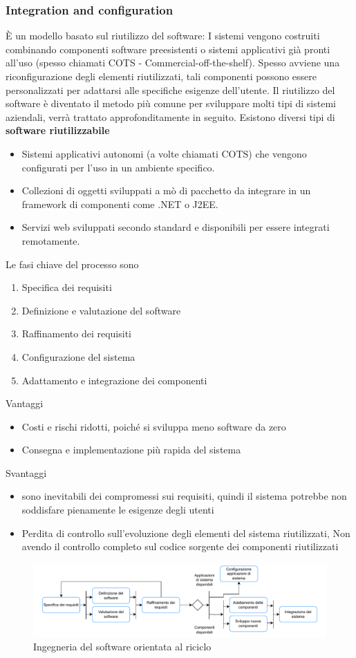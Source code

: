 \documentclass[10pt, letterpaper]{report}
\begin{document}
\subsubsection{Integration and configuration}
È un modello basato sul riutilizzo del software: I sistemi vengono costruiti combinando componenti software preesistenti o sistemi applicativi già pronti all'uso (spesso chiamati COTS - Commercial-off-the-shelf). Spesso avviene una riconfigurazione degli elementi riutilizzati, tali componenti possono essere personalizzati per adattarsi alle specifiche esigenze dell'utente. \acc Il riutilizzo del software è diventato il metodo più comune per sviluppare molti tipi di sistemi aziendali, verrà trattato approfonditamente in seguito. Esistono diversi tipi di \textbf{software riutilizzabile}\begin{itemize}
    \item Sistemi applicativi autonomi (a volte chiamati COTS) che vengono configurati per l'uso in un ambiente specifico.
    \item Collezioni di oggetti sviluppati a mò di pacchetto da integrare in un framework di componenti come .NET o J2EE. 
    \item Servizi web sviluppati secondo standard e disponibili per essere integrati remotamente.
\end{itemize}
Le fasi chiave del processo sono\begin{enumerate}
    \item Specifica dei requisiti 
    \item Definizione e valutazione del software 
    \item Raffinamento dei requisiti 
    \item Configurazione del sistema 
    \item Adattamento e integrazione dei componenti
\end{enumerate}
Vantaggi\begin{itemize}
    \item Costi e rischi ridotti, poiché si sviluppa meno software da zero 
    \item Consegna e implementazione più rapida del sistema
\end{itemize}
Svantaggi\begin{itemize}
    \item  sono inevitabili dei compromessi sui requisiti, quindi il sistema potrebbe non soddisfare pienamente le esigenze degli utenti 
    \item Perdita di controllo sull'evoluzione degli elementi del sistema riutilizzati, Non avendo il controllo completo sul codice sorgente dei componenti riutilizzati
\end{itemize}
\begin{center}
    \begin{figure}[h!]
        \centering 
        \includegraphics[width=1\textwidth ]{images/IngegneriaRiuso.pdf}
        \caption{Ingegneria del software orientata al riciclo}
    \end{figure}\end{center}
\end{document}
